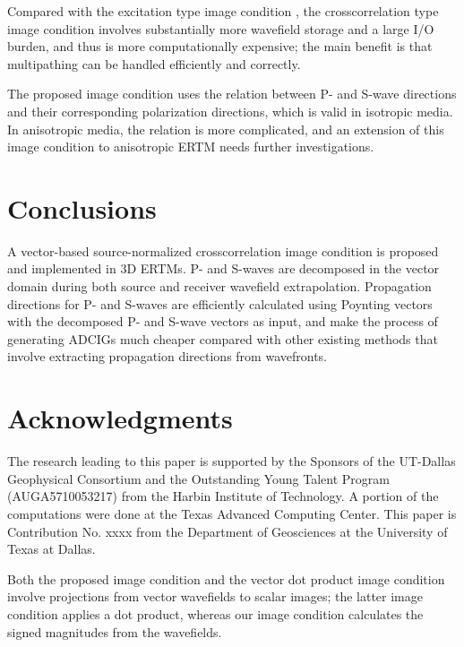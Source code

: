 \documentclass[manuscript,ulem,graphix,revised]{geophysics}
\begin{document}
Compared with the excitation type image condition \citep{wenlong_vct15,wenlong_3d16}, the crosscorrelation type image condition involves substantially more wavefield storage and a large I/O burden, and thus is more computationally expensive; the main benefit is that multipathing can be handled efficiently and correctly.

The proposed image condition uses the relation between P- and S-wave directions and their corresponding polarization directions, which is valid in isotropic media. In anisotropic media, the relation is more complicated, and an extension of this image condition to anisotropic ERTM needs further investigations.


\section{Conclusions}

A vector-based source-normalized crosscorrelation image condition is proposed and implemented in 3D ERTMs. P- and S-waves are decomposed in the vector domain during both source and receiver wavefield extrapolation. Propagation directions for P- and S-waves are efficiently calculated using Poynting vectors with the decomposed P- and S-wave vectors as input, and make the process of generating ADCIGs much cheaper compared with other existing methods that involve extracting propagation directions from wavefronts. 


\section{Acknowledgments}

The research leading to this paper is supported by the Sponsors of the
UT-Dallas Geophysical Consortium and the Outstanding Young Talent Program (AUGA5710053217) from the Harbin Institute of Technology. A portion of the computations were done at the Texas Advanced Computing Center. This paper is Contribution No. xxxx
from the Department of Geosciences at the University of Texas at Dallas.


Both the proposed image condition and the vector dot product image condition \citep{wang_cl16,zhu17,du17} involve projections from vector wavefields to scalar images; the latter image condition applies a dot product, whereas our image condition calculates the signed magnitudes from the wavefields.
\end{document}
